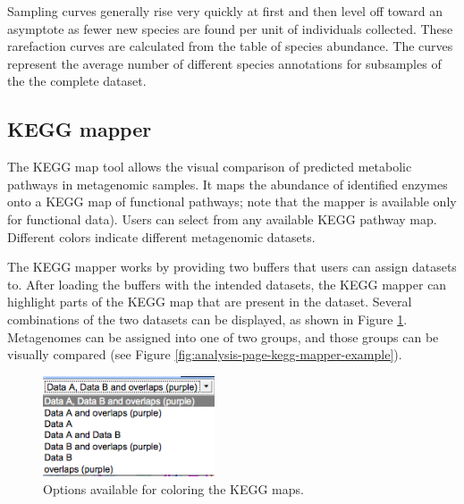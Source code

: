\documentclass[12pt,fullpage]{report}
\begin{document}
Sampling curves generally rise very quickly at first and then level off toward an asymptote as fewer new species are found per unit of individuals collected. These rarefaction curves are calculated from the table of species abundance. The curves represent the average number of different species annotations for subsamples of the the complete dataset.






\subsection{KEGG mapper}
\label{section:kegg-mapper}

The KEGG map tool allows the visual comparison of predicted metabolic pathways in metagenomic samples.
It maps the abundance of identified enzymes onto a KEGG \cite{KEGG} map of functional pathways; note that the mapper is available only for functional data).
Users can select from any available KEGG pathway map.
Different colors indicate different metagenomic datasets.

The KEGG mapper works by providing two buffers that users can assign datasets to.
After loading the buffers with the intended datasets, the KEGG mapper can highlight parts of the KEGG map that are present in the dataset.
Several combinations of the two datasets can be displayed, as shown in Figure \ref{fig:analysis-page-kegg-mapper-options}.
Metagenomes can be assigned into one of two groups, and those groups can be visually compared
(see Figure \ref{fig:analysis-page-kegg-mapper-example}).

\begin{figure}
\begin{center}
\includegraphics[width=2in]{Images/analysis-page-kegg-mapper-options.png}
\end{center}
\caption{Options available for coloring the KEGG maps.}
\label{fig:analysis-page-kegg-mapper-options}
\end{figure}
\end{document}
